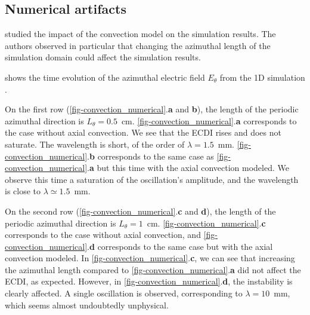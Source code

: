   \subsection{Numerical artifacts}
    \citet{lafleur2016a} studied the impact of the convection model on the simulation results.
    The authors observed in particular that changing the azimuthal length of the simulation domain could affect the simulation results.

     shows the time evolution of the azimuthal electric field $E_{\theta}$ from the \ac{1D} simulation \citep{lafleur2016a}.

    On the first row (\cref{fig-convection_numerical}.{\bf a} and {\bf b}), the length of the periodic azimuthal direction is $L_{\theta}=0.5$~cm.
    \cref{fig-convection_numerical}.{\bf a} corresponds to the case without axial convection.
    We see that the \ac{ECDI} rises and does not saturate.
    The wavelength is short, of the order of $\lambda = 1.5$~mm.
    \cref{fig-convection_numerical}.{\bf b} corresponds to the same case as \cref{fig-convection_numerical}.{\bf a} but this time with the axial convection modeled.
    We observe this time a saturation of the oscillation's amplitude, and the wavelength is close to $\lambda \simeq 1.5$~mm.

    On the second row (\cref{fig-convection_numerical}.{\bf c} and {\bf d}), the length of the periodic azimuthal direction is $L_{\theta}=1$~cm.
    \cref{fig-convection_numerical}.{\bf c} corresponds to the case without axial convection, and \cref{fig-convection_numerical}.{\bf d} corresponds to the same case but with the axial convection modeled.
    In \cref{fig-convection_numerical}.{\bf c}, we can see that increasing the azimuthal length compared to \cref{fig-convection_numerical}.{\bf a} did not affect the \ac{ECDI}, as expected.
    However, in  \cref{fig-convection_numerical}.{\bf d}, the instability is clearly affected.
    A single oscillation is observed, corresponding to $\lambda=10$~mm, which seems almost undoubtedly unphysical.

